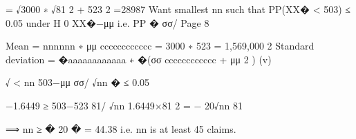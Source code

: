 \documentclass[a4paper,12pt]{article}
\begin{document}
= √3000 ∗ √81 2 + 523 2 =28987 
Want smallest nn such that PP(XX� < 503) ≤ 0.05 under H 0
XX�−μμ
i.e. PP � σσ/
Page 8


Mean = \lambda\lambda nnnnnn ∗ μμ cccccccccccc = 3000 ∗ 523 = 1,569,000
2
Standard deviation = �\lambda\lambda aaaaaaaaaaaa ∗ �(σσ cccccccccccc
+ μμ 2 )
(v)

√
<
nn
503−μμ
σσ/ √nn
� ≤ 0.05

−1.6449 ≥
503−523
81/ √nn
1.6449×81 2
= −
20√nn
81

⟹ nn ≥ � 20 � = 44.38
i.e. nn is at least 45 claims.


\end{document}
